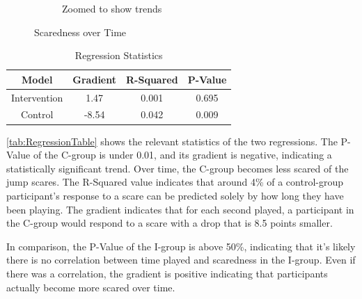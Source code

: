 \documentclass[12pt,a4paper]{article}\usepackage[]{graphicx}\usepackage[]{color}
\begin{document}
\begin{figure}[htb]
\begin{subfigure}[t]{.49\linewidth}
{}



		\caption{Zoomed to show trends}
	\end{subfigure}
	\caption{Scaredness over Time}
	\label{fig:ScarednessOverTime}
\end{figure}

\begin{table}
	\vspace{-20pt}
    \caption{Regression Statistics}
    \label{tab:RegressionTable}
	\vspace{-20pt}
    \begin{footnotesize}
    	\begin{center}

\begin{tabular}{cccc}
\toprule
\textbf{Model} & \textbf{Gradient} & \textbf{R-Squared} & \textbf{P-Value}\\
\midrule
Intervention & 1.47 & 0.001 & 0.695\\
Control & -8.54 & 0.042 & 0.009\\
\bottomrule
\end{tabular}

		\end{center}
	\end{footnotesize}
	\vspace{-20pt}
\end{table}

\vref{tab:RegressionTable} shows the relevant statistics of the two regressions.
The P-Value of the C-group is under 0.01, and its gradient is negative, indicating a statistically significant trend.
Over time, the C-group becomes less scared of the jump scares.
The R-Squared value indicates that around 4\% of a control-group participant's response to a scare can be predicted solely by how long they have been playing.
The gradient indicates that for each second played, a participant in the C-group would respond to a scare with a drop that is 8.5 points smaller.

In comparison, the P-Value of the I-group is above 50\%, indicating that it's likely there is no correlation between time played and scaredness in the I-group.
Even if there was a correlation, the gradient is positive indicating that participants actually become more scared over time.
\end{document}
